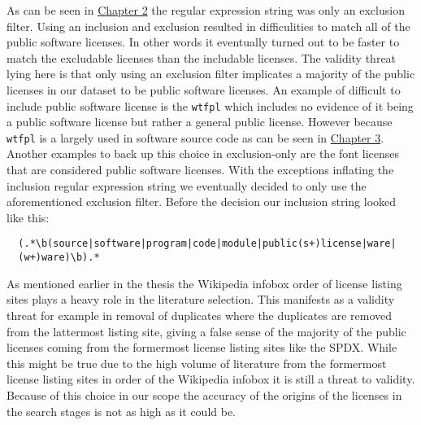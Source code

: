 As can be seen in  \hyperref[methods]{Chapter 2} the regular expression string was only an exclusion filter. Using an inclusion and exclusion resulted in difficulities to match all of the public software licenses. In other words it eventually turned out to be faster to match the excludable licenses than the includable licenses. The validity threat lying here is that only using an exclusion filter implicates a majority of the public licenses in our dataset to be public software licenses. An example of difficult to include public software license is the \texttt{wtfpl} which includes no evidence of it being a public software license but rather a general public license. However because \texttt{wtfpl} is a largely used in software source code as can be seen in \hyperref[results]{Chapter 3}. Another examples to back up this choice in exclusion-only are the font licenses that are considered public software licenses. With the exceptions inflating the inclusion regular expression string we eventually decided to only use the aforementioned exclusion filter. Before the decision our inclusion string looked like this:
\begin{verbatim}
  (.*\b(source|software|program|code|module|public(s+)license|ware|
  (w+)ware)\b).*
\end{verbatim}

As mentioned earlier in the thesis the Wikipedia infobox order of license listing sites plays a heavy role in the literature selection. This manifests as a validity threat for example in removal of duplicates where the duplicates are removed from the lattermost listing site, giving a false sense of the majority of the public licenses coming from the formermost license listing sites like the SPDX. While this might be true due to the high volume of literature from the formermost license listing sites in order of the Wikipedia infobox it is still a threat to validity. Because of this choice in our scope the accuracy of the origins of the licenses in the search stages is not as high as it could be.

